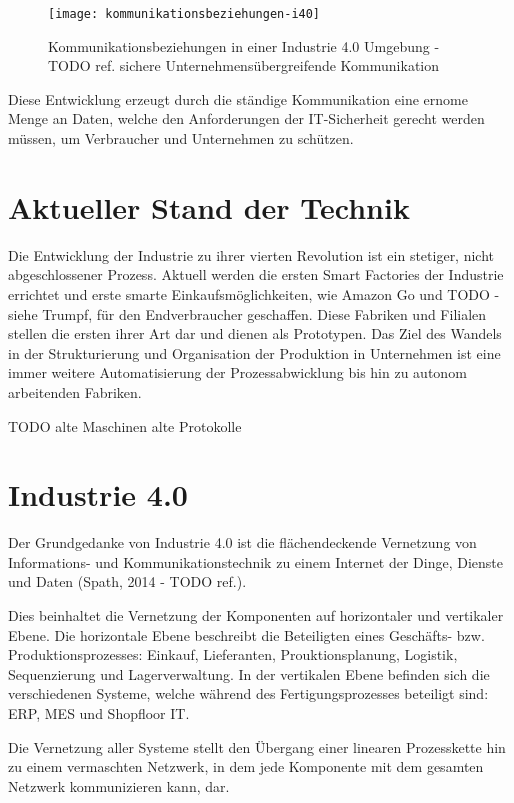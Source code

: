 \begin{figure}[h]
  \centering
  \texttt{[image: kommunikationsbeziehungen-i40]}
  \caption{Kommunikationsbeziehungen in einer Industrie 4.0 Umgebung - TODO ref. sichere Unternehmensübergreifende Kommunikation}
  \label{Kap2:Industrie4.0-Kommunikation}
\end{figure}

\clearpage

Diese Entwicklung erzeugt durch die ständige Kommunikation eine ernome Menge an Daten, welche den Anforderungen der IT-Sicherheit gerecht werden müssen, um Verbraucher und Unternehmen zu schützen.

\section{Aktueller Stand der Technik}
Die Entwicklung der Industrie zu ihrer vierten Revolution ist ein stetiger, nicht abgeschlossener Prozess. Aktuell werden die ersten Smart Factories der Industrie errichtet und erste smarte Einkaufsmöglichkeiten, wie Amazon Go und TODO - siehe Trumpf, für den Endverbraucher geschaffen. Diese Fabriken und Filialen stellen die ersten ihrer Art dar und dienen als Prototypen. Das Ziel des Wandels in der Strukturierung und Organisation der Produktion in Unternehmen ist eine immer weitere Automatisierung der Prozessabwicklung bis hin zu autonom arbeitenden Fabriken.

TODO alte Maschinen alte Protokolle

\section{Industrie 4.0}

Der Grundgedanke von Industrie 4.0 ist die flächendeckende Vernetzung von Informations- und Kommunikationstechnik zu einem Internet der Dinge, Dienste und Daten (Spath, 2014 - TODO ref.). 

Dies beinhaltet die Vernetzung der Komponenten auf horizontaler und vertikaler Ebene. Die horizontale Ebene beschreibt die Beteiligten eines Geschäfts- bzw. Produktionsprozesses: Einkauf, Lieferanten, Prouktionsplanung, Logistik, Sequenzierung und Lagerverwaltung. In der vertikalen Ebene befinden sich die verschiedenen Systeme, welche während des Fertigungsprozesses beteiligt sind: ERP, MES und Shopfloor IT.

Die Vernetzung aller Systeme stellt den Übergang einer linearen Prozesskette hin zu einem vermaschten Netzwerk, in dem jede Komponente mit dem gesamten Netzwerk kommunizieren kann, dar.

